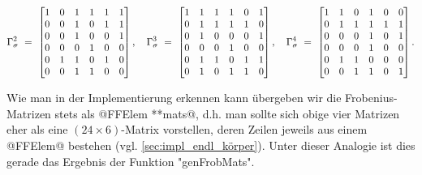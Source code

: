 \[ \Gamma_\sigma^2 \ =\ 
  \begin{bmatrix}
    1 & 0 & 1 & 1 & 1 & 1 \\
    0 & 0 & 1 & 0 & 1 & 1 \\
    0 & 0 & 1 & 0 & 0 & 1 \\
    0 & 0 & 0 & 1 & 0 & 0 \\
    0 & 1 & 1 & 0 & 1 & 0 \\
    0 & 0 & 1 & 1 & 0 & 0 \\
    \end{bmatrix},
  \quad\Gamma_\sigma^3 \ =\ 
  \begin{bmatrix}
    1 & 1 & 1 & 1 & 0 & 1 \\
    0 & 1 & 1 & 1 & 1 & 0 \\
    0 & 1 & 0 & 0 & 0 & 1 \\
    0 & 0 & 0 & 1 & 0 & 0 \\
    0 & 1 & 1 & 0 & 1 & 1 \\
    0 & 1 & 0 & 1 & 1 & 0 \\
  \end{bmatrix},
  \quad\Gamma_\sigma^4 \ =\ 
  \begin{bmatrix}
    1 & 1 & 0 & 1 & 0 & 0 \\
    0 & 1 & 1 & 1 & 1 & 1 \\
    0 & 0 & 0 & 1 & 0 & 1 \\
    0 & 0 & 0 & 1 & 0 & 0 \\
    0 & 1 & 1 & 0 & 0 & 0 \\
    0 & 0 & 1 & 1 & 0 & 1 \\
  \end{bmatrix}.\]

Wie man in der Implementierung erkennen kann übergeben wir die
Frobenius-Matrizen stets als @FFElem **mats@, d.h. man sollte sich obige vier
Matrizen eher als eine $(24\times 6)$-Matrix vorstellen, deren Zeilen jeweils
aus einem @FFElem@ bestehen (vgl. \autoref{sec:impl_endl_körper}). 
Unter dieser Analogie ist dies gerade das Ergebnis der Funktion "genFrobMats".

